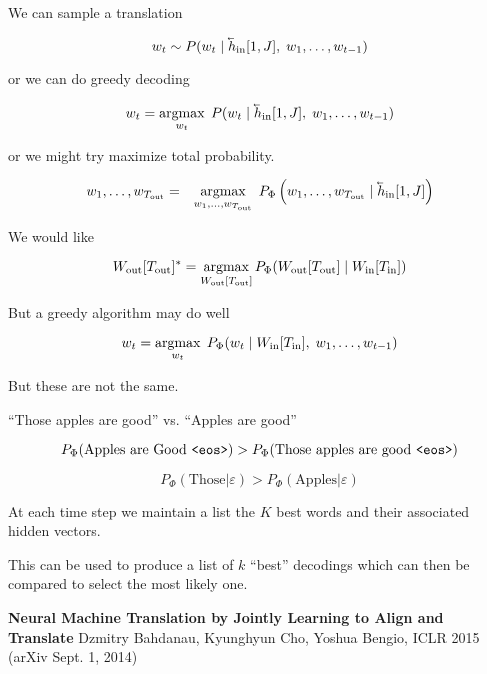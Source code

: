 {

We can sample a translation

$$w_t \sim P(w_t\;|\;\cev{h}_{\mathrm{in}}[1,J],\;w_1,\ldots,w_{t-1})$$

\vfill
or we can do greedy decoding

$$w_t = \argmax_{w_t}\; P(w_t\;|\;\cev{h}_{\mathrm{in}}[1,J],\;w_1,\ldots,w_{t-1})$$

\vfill
or we might try maximize total probability.

\begin{eqnarray*}
w_1,\ldots,w_{T_{\mathrm{out}}}
& = & \argmax_{w_1,\ldots,w_{T_{\mathrm{out}}}} \;P_\Phi\left(w_1,\ldots,w_{T_{\mathrm{out}}} \;|\; \cev{h}_{\mathrm{in}}[1,J]\right)
\end{eqnarray*}


We would like

\vfill
$$W_{\mathrm{out}}[T_{\mathrm{out}}]^* = \operatorname*{argmax}_{W_{\mathrm{out}}[T_{\mathrm{out}}]}
P_\Phi(W_{\mathrm{out}}[T_{\mathrm{out}}] \;|\;W_{\mathrm{in}}[T_{\mathrm{in}}])$$

\vfill
But a greedy algorithm may do well

\vfill
$$w_t = \operatorname*{argmax}_{w_t}\; P_\Phi(w_t\;|\;W_{\mathrm{in}}[T_{\mathrm{in}}],\;w_1,\ldots,w_{t-1})$$

\vfill
But these are not the same.


``Those apples are good'' vs. ``Apples are good''

\vfill
$$P_\Phi(\mbox{Apples are Good {\tt <eos>}}) > P_\Phi(\mbox{Those apples are good {\tt <eos>}})$$

\vfill
$$P_\Phi(\mbox{Those}|\varepsilon) > P_\Phi(\mbox{Apples}|\varepsilon)$$
    

At each time step we maintain a list the $K$ best words and their associated hidden vectors.

\vfill
This can be used to produce a list of $k$ ``best'' decodings which can then be compared to select
the most likely one.


{\bf Neural Machine Translation by Jointly Learning to {\color{red} Align} and Translate}
Dzmitry Bahdanau, Kyunghyun Cho, Yoshua Bengio, ICLR 2015 (arXiv Sept. 1, 2014)

}

